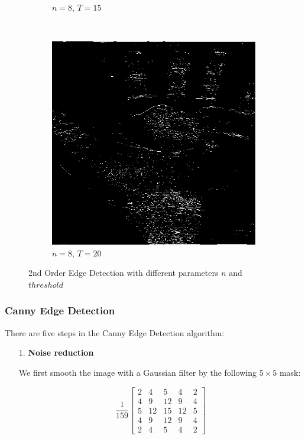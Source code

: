 \documentclass{article}
\newcommand{\tb}{\textbf}
\begin{document}
\begin{enumerate}[label=(\alph*)]
\begin{figure}[!htb]
\begin{subfigure}[b]{0.3\textwidth}
            \caption{$n = 8$, $T = 15$}
        \end{subfigure}
        ~
        \begin{subfigure}[b]{0.3\textwidth}
            \includegraphics[width=\textwidth]{img/ED2_8_20.png}
            \caption{$n = 8$, $T = 20$}
        \end{subfigure}

        \caption{2nd Order Edge Detection with different parameters $n$ and $threshold$}
    \end{figure}

    \newpage
    \subsubsection*{Canny Edge Detection}

    There are five steps in the Canny Edge Detection algorithm:

    \begin{enumerate}
        \item [1.] \tb{Noise reduction}
        
        We first smooth the image with a Gaussian filter by the following $5 \times 5$ mask:

        $$
        \frac{1}{159} 
        \begin{bmatrix}
            2 &  4 &  5 &  4 & 2 \\
            4 &  9 & 12 &  9 & 4 \\
            5 & 12 & 15 & 12 & 5 \\
            4 &  9 & 12 &  9 & 4 \\
            2 &  4 &  5 &  4 & 2
        \end{bmatrix}
        $$


\end{enumerate}
\end{enumerate}
\end{document}
